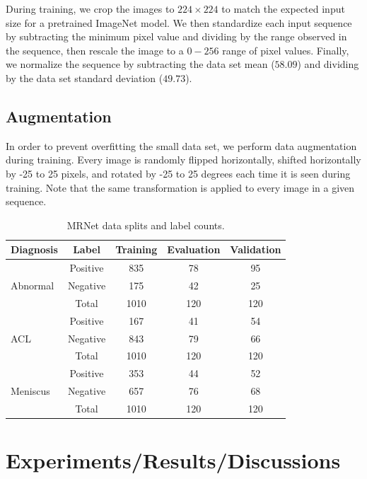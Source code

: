 \documentclass[10pt,twocolumn,letterpaper]{article}
\begin{document}
During training, we crop the images to $224 \times 224$ to match the expected input size for a pretrained ImageNet model. We then standardize each input sequence by subtracting the minimum pixel value and dividing by the range observed in the sequence, then rescale the image to a $0-256$ range of pixel values. Finally, we normalize the sequence by subtracting the data set mean ($58.09$) and dividing by the data set standard deviation ($49.73$).

\subsection{Augmentation}

In order to prevent overfitting the small data set, we perform data augmentation during training. Every image is randomly flipped horizontally, shifted horizontally by -25 to 25 pixels, and rotated by -25 to 25 degrees each time it is seen during training. Note that the same transformation is applied to every image in a given sequence.

\begin{table}
\begin{center}
\begin{tabular}{|lc|c|c|c|}
\hline
Diagnosis & Label & Training & Evaluation & Validation \\
\hline\hline
\multirow{ 3}{*}{Abnormal} & Positive & 835 & 78 & 95 \\
                           & Negative & 175 & 42 & 25 \\
                           & Total & 1010 & 120 & 120 \\
\hline
\multirow{ 3}{*}{ACL}      & Positive & 167 & 41 & 54 \\
                           & Negative & 843 & 79 & 66 \\
                           & Total & 1010 & 120 & 120 \\
\hline
\multirow{ 3}{*}{Meniscus} & Positive & 353 & 44 & 52 \\
                           & Negative & 657 & 76 & 68 \\
                           & Total & 1010 & 120 & 120 \\
\hline
\end{tabular}
\end{center}
\caption{MRNet data splits and label counts.}
\label{tab:dataset}
\end{table}

\section{Experiments/Results/Discussions} %
\end{document}
